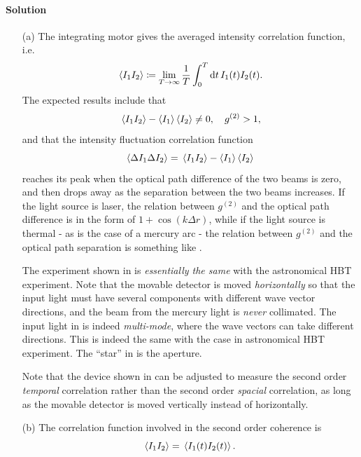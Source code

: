 \documentclass[hyperref, a4paper]{article}
\begin{document}
\paragraph{Solution} \begin{itemize}
    \item[(a)] The integrating motor gives the averaged intensity correlation function, i.e.
    \begin{equation}
        \expval*{I_1 I_2} \coloneqq \lim_{T \to \infty} \frac{1}{T} \int_0^T \dd{t} I_1(t) I_2(t). 
    \end{equation} 
    The expected results include that
    \begin{equation}
        \expval*{I_1 I_2} - \expval{I_1} \expval{I_2} \neq 0, \quad g^{(2)} > 1,
    \end{equation} 
    and that the intensity fluctuation correlation function 
    \begin{equation}
        \expval{\Delta I_1 \Delta I_2} = \expval*{I_1 I_2} - \expval{I_1} \expval{I_2}
    \end{equation}
    reaches its peak when the optical path difference of the two beams is zero, 
    and then drops away as the separation between the two beams increases. 
    If the light source is laser, the relation between $g^{(2)}$ and the optical path difference is in the form 
    of $1 + \cos(k \Delta r)$, while if the light source is thermal - as is the case of a mercury arc - 
    the relation between $g^{(2)}$ and the optical path separation is something like .

    The experiment shown in  is \emph{essentially the same} with the astronomical HBT experiment.
    Note that the movable detector is moved \emph{horizontally} so that the input light must have several components with different wave vector directions, 
    and the beam from the mercury light is \emph{never} collimated.
    The input light in  is indeed \emph{multi-mode}, where the wave vectors can take different directions.
    This is indeed the same with the case in astronomical HBT experiment.
    The ``star'' in  is the aperture.

    Note that the device shown in  can be adjusted to measure the second order \emph{temporal} correlation 
    rather than the second order \emph{spacial} correlation, as long as the movable detector is moved vertically instead of horizontally.

    \item[(b)] The correlation function involved in the second order coherence is  
    \begin{equation}
        \expval{I_1 I_2} = \expval*{ I_1(t) I_2(t) } .
    \end{equation}
    

\end{itemize}
\end{document}
